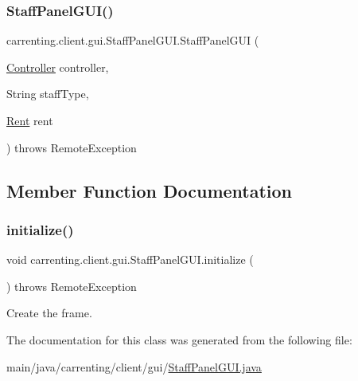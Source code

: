 \subsubsection{\texorpdfstring{StaffPanelGUI()}{StaffPanelGUI()}}
{\footnotesize\ttfamily carrenting.\+client.\+gui.\+Staff\+Panel\+G\+U\+I.\+Staff\+Panel\+G\+UI (\begin{DoxyParamCaption}\item[{\mbox{\hyperlink{classcarrenting_1_1client_1_1_controller}{Controller}}}]{controller,  }\item[{String}]{staff\+Type,  }\item[{\mbox{\hyperlink{classcarrenting_1_1server_1_1jdo_1_1_rent}{Rent}}}]{rent }\end{DoxyParamCaption}) throws Remote\+Exception}



\subsection{Member Function Documentation}
\mbox{\label{classcarrenting_1_1client_1_1gui_1_1_staff_panel_g_u_i_aa2e22ff26b5539e2f2b4fdaf3e948802}} 
\subsubsection{\texorpdfstring{initialize()}{initialize()}}
{\footnotesize\ttfamily void carrenting.\+client.\+gui.\+Staff\+Panel\+G\+U\+I.\+initialize (\begin{DoxyParamCaption}{ }\end{DoxyParamCaption}) throws Remote\+Exception}

Create the frame. 

The documentation for this class was generated from the following file\+:\begin{DoxyCompactItemize}
\item 
main/java/carrenting/client/gui/\mbox{\hyperlink{_staff_panel_g_u_i_8java}{Staff\+Panel\+G\+U\+I.\+java}}\end{DoxyCompactItemize}
